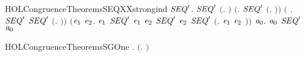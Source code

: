 \begin{SaveVerbatim}{HOLCongruenceTheoremsSEQXXstrongind}
\HOLTokenTurnstile{} \HOLSymConst{\HOLTokenForall{}}\ensuremath{\HOLBoundVar{SEQ}\sp{\prime}}.
       \ensuremath{\HOLBoundVar{SEQ}\sp{\prime}} \ensuremath{(}\HOLTokenLambda{}. \ensuremath{)} \HOLSymConst{\HOLTokenConj{}} \ensuremath{(}\HOLSymConst{\HOLTokenForall{}}. \ensuremath{\HOLBoundVar{SEQ}\sp{\prime}} \ensuremath{(}\HOLTokenLambda{}. \ensuremath{)}\ensuremath{)} \HOLSymConst{\HOLTokenConj{}}
       \ensuremath{(}\HOLSymConst{\HOLTokenForall{}} .   \HOLSymConst{\HOLTokenConj{}} \ensuremath{\HOLBoundVar{SEQ}\sp{\prime}}  \HOLSymConst{\HOLTokenImp{}} \ensuremath{\HOLBoundVar{SEQ}\sp{\prime}} \ensuremath{(}\HOLTokenLambda{}. \HOLSymConst{\ensuremath{\ldotp}} \ensuremath{)}\ensuremath{)} \HOLSymConst{\HOLTokenConj{}}
       \ensuremath{(}\HOLSymConst{\HOLTokenForall{}}\ensuremath{\HOLBoundVar{e}\sb{\mathrm{1}}} \ensuremath{\HOLBoundVar{e}\sb{\mathrm{2}}}.
             \ensuremath{\HOLBoundVar{e}\sb{\mathrm{1}}} \HOLSymConst{\HOLTokenConj{}} \ensuremath{\HOLBoundVar{SEQ}\sp{\prime}} \ensuremath{\HOLBoundVar{e}\sb{\mathrm{1}}} \HOLSymConst{\HOLTokenConj{}}  \ensuremath{\HOLBoundVar{e}\sb{\mathrm{2}}} \HOLSymConst{\HOLTokenConj{}} \ensuremath{\HOLBoundVar{SEQ}\sp{\prime}} \ensuremath{\HOLBoundVar{e}\sb{\mathrm{2}}} \HOLSymConst{\HOLTokenImp{}}
            \ensuremath{\HOLBoundVar{SEQ}\sp{\prime}} \ensuremath{(}\HOLTokenLambda{}. \ensuremath{\HOLBoundVar{e}\sb{\mathrm{1}}}  \HOLSymConst{\ensuremath{+}} \ensuremath{\HOLBoundVar{e}\sb{\mathrm{2}}} \ensuremath{)}\ensuremath{)} \HOLSymConst{\HOLTokenImp{}}
       \HOLSymConst{\HOLTokenForall{}}\ensuremath{\HOLBoundVar{a}\sb{\mathrm{0}}}.  \ensuremath{\HOLBoundVar{a}\sb{\mathrm{0}}} \HOLSymConst{\HOLTokenImp{}} \ensuremath{\HOLBoundVar{SEQ}\sp{\prime}} \ensuremath{\HOLBoundVar{a}\sb{\mathrm{0}}}
\end{SaveVerbatim}
\newcommand{\HOLCongruenceTheoremsSEQXXstrongind}{\UseVerbatim{HOLCongruenceTheoremsSEQXXstrongind}}
\begin{SaveVerbatim}{HOLCongruenceTheoremsSGOne}
\HOLTokenTurnstile{} \HOLSymConst{\HOLTokenForall{}}.  \ensuremath{(}\HOLTokenLambda{}. \ensuremath{)}
\end{SaveVerbatim}
